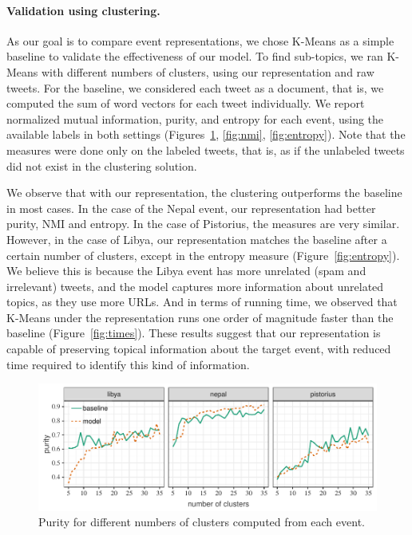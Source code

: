 
\paragraph{Validation using clustering.}
%
As our goal is to compare event representations, we chose K-Means as a simple
baseline to validate the effectiveness of our model.
%
To find sub-topics, we ran K-Means with different numbers of clusters, using our
representation and raw tweets.
%
For the baseline, we considered each tweet as a document, that is, we computed
the sum of word vectors for each tweet individually.
%
We report normalized mutual information, purity, and entropy for each event,
using the available labels in both settings (Figures~\ref{fig:purity},
\ref{fig:nmi}, \ref{fig:entropy}).
%
Note that the measures were done only on the labeled tweets, that is, as if the
unlabeled tweets did not exist in the clustering solution.


We observe that with our representation, the clustering outperforms the baseline
in most cases. 
%
In the case of the Nepal event, our representation had better purity, NMI and
entropy. 
%
In the case of Pistorius, the measures are very similar. 
%
However, in the case of Libya, our representation matches the baseline after a
certain number of clusters, except in the entropy measure
(Figure~\ref{fig:entropy}).
%
We believe this is because the Libya event has more unrelated (spam and
irrelevant) tweets, and the model captures more information about unrelated
topics, as they use more URLs.
%
And in terms of running time, we observed that K-Means under the representation
runs one order of magnitude faster than the baseline (Figure~\ref{fig:times}). 
%
These results suggest that our representation is capable of preserving topical
information about the target event, with reduced time required to identify this
kind of information. 
%

\begin{figure}
  \centering
  \includegraphics[width=\textwidth]{figures/url-model/purity}
  \caption{Purity for different numbers of clusters computed from each event.}\label{fig:purity}
\end{figure}%

